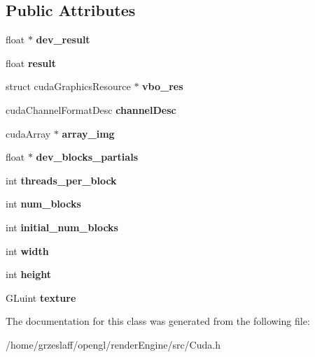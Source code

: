 \subsection*{Public Attributes}
\begin{DoxyCompactItemize}
\item 
\hypertarget{classCuda_a376991054d4f375b8e80dbf3de814fa3}{float $\ast$ {\bfseries dev\-\_\-result}}\label{classCuda_a376991054d4f375b8e80dbf3de814fa3}

\item 
\hypertarget{classCuda_a6e17a5bea07d6e035596a65cf697f8e4}{float {\bfseries result}}\label{classCuda_a6e17a5bea07d6e035596a65cf697f8e4}

\item 
\hypertarget{classCuda_abf4d549e1fc05f40d488e5a682caebb4}{struct cuda\-Graphics\-Resource $\ast$ {\bfseries vbo\-\_\-res}}\label{classCuda_abf4d549e1fc05f40d488e5a682caebb4}

\item 
\hypertarget{classCuda_adf9319dc34ccfabc54941b701b950cb2}{cuda\-Channel\-Format\-Desc {\bfseries channel\-Desc}}\label{classCuda_adf9319dc34ccfabc54941b701b950cb2}

\item 
\hypertarget{classCuda_aa75c5110f5cba529acbb707727d94fb7}{cuda\-Array $\ast$ {\bfseries array\-\_\-img}}\label{classCuda_aa75c5110f5cba529acbb707727d94fb7}

\item 
\hypertarget{classCuda_a25c05d534e939c3df4e1825c8cc1e873}{float $\ast$ {\bfseries dev\-\_\-blocks\-\_\-partials}}\label{classCuda_a25c05d534e939c3df4e1825c8cc1e873}

\item 
\hypertarget{classCuda_a70efbe2f85ebc1996c582e9249f6ea89}{int {\bfseries threads\-\_\-per\-\_\-block}}\label{classCuda_a70efbe2f85ebc1996c582e9249f6ea89}

\item 
\hypertarget{classCuda_a1f71037e1022dc5679bf3b9a0e028d62}{int {\bfseries num\-\_\-blocks}}\label{classCuda_a1f71037e1022dc5679bf3b9a0e028d62}

\item 
\hypertarget{classCuda_acd417ec7c2d1eb3fb671c796833ddf5a}{int {\bfseries initial\-\_\-num\-\_\-blocks}}\label{classCuda_acd417ec7c2d1eb3fb671c796833ddf5a}

\item 
\hypertarget{classCuda_ab200427d68fd4992723452b63e96fbf6}{int {\bfseries width}}\label{classCuda_ab200427d68fd4992723452b63e96fbf6}

\item 
\hypertarget{classCuda_a97964aaf5a9670154ecf59e84b02f926}{int {\bfseries height}}\label{classCuda_a97964aaf5a9670154ecf59e84b02f926}

\item 
\hypertarget{classCuda_ae89727bb9410a46877d5c2f0b55a31d8}{G\-Luint {\bfseries texture}}\label{classCuda_ae89727bb9410a46877d5c2f0b55a31d8}

\end{DoxyCompactItemize}


The documentation for this class was generated from the following file\-:\begin{DoxyCompactItemize}
\item 
/home/grzeslaff/opengl/render\-Engine/src/Cuda.\-h\end{DoxyCompactItemize}
